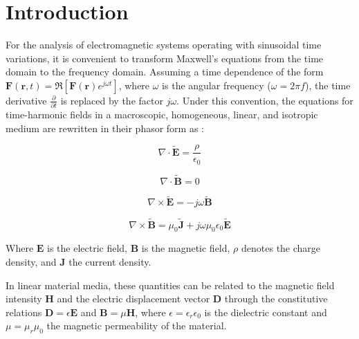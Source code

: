 \documentclass[11pt,a4paper,twoside,pdf]{article}
\numberwithin{equation}{section}
\begin{document}

\tableofcontents


\pagestyle{fancy}
\fancyhead[RO,LE]{\leftmark}
\fancyhead[LO,RE]{\thepage}
\fancyfoot{}



\newpage


\section{Introduction}


For the analysis of electromagnetic systems operating with sinusoidal time variations, it is convenient to transform Maxwell's equations from the time domain to the frequency domain. Assuming a time dependence of the form $\mathbf{F}(\mathbf{r}, t) = \mathfrak{R} \left[ \mathbf{F}(\mathbf{r})e^{j\omega t} \right]$, where $\omega$ is the angular frequency ($\omega = 2\pi f$), the time derivative $\frac{\partial}{\partial t}$ is replaced by the factor $j\omega$. Under this convention, the equations for time-harmonic fields in a macroscopic, homogeneous, linear, and isotropic medium are rewritten in their phasor form as \cite{martin2021campo}:

\begin{equation}
\nabla \cdot \tilde{\mathbf{E}} = \frac{\rho}{\epsilon_0}
\label{leyGauss}
\end{equation}

\begin{equation}
\nabla \cdot \tilde{\mathbf{B}} = 0
\end{equation}

\begin{equation}
\nabla \times \tilde{\mathbf{E}} = -j\omega \tilde{\mathbf{B}}
\label{rotE}
\end{equation}

\begin{equation}
\nabla \times \tilde{\mathbf{B}} = \mu_0\tilde{\mathbf{J}} + j\omega\mu_0\epsilon_0 \tilde{\mathbf{E}}
\label{rotH}
\end{equation}


Where $\mathbf{E}$ is the electric field, $\mathbf{B}$ is the magnetic field, $\rho$ denotes the charge density, and $\mathbf{J}$ the current density.

In linear material media, these quantities can be related to the magnetic field intensity $\mathbf{H}$ and the electric displacement vector $\mathbf{D}$ through the constitutive relations $\mathbf{D} = \epsilon \mathbf{E}$ and $\mathbf{B} = \mu \mathbf{H}$, where $\epsilon = \epsilon_r \epsilon_0$ is the dielectric constant and $\mu = \mu_r \mu_0$ the magnetic permeability of the material.
\end{document}
